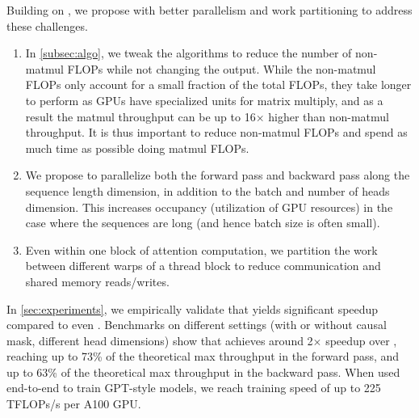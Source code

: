 Building on \sysnameone, we propose \sysname with better parallelism and work
partitioning to address these challenges.
\begin{enumerate}
  \item In \cref{subsec:algo}, we tweak the algorithms to reduce the number of non-matmul FLOPs while not
  changing the output.
  While the non-matmul FLOPs only account for a small fraction of the total FLOPs,
  they take longer to perform as GPUs have specialized units for matrix multiply,
  and as a result the matmul throughput can be up to 16$\times$ higher than non-matmul
  throughput.
  It is thus important to reduce non-matmul FLOPs and spend as much time as
  possible doing matmul FLOPs.

  \item We propose to parallelize both the forward pass and backward pass along
  the sequence length dimension, in addition to the batch and number of heads
  dimension. This increases occupancy (utilization of GPU resources) in the case
  where the sequences are long (and hence batch size is often small).

  \item Even within one block of attention computation, we partition the work
  between different warps of a thread block to reduce communication and shared
  memory reads/writes.

\end{enumerate}

In \cref{sec:experiments}, we empirically validate that \sysname yields significant speedup compared to
even \sysnameone. Benchmarks on different settings (with or without causal mask,
different head dimensions) show that \sysname achieves around 2$\times$ speedup over
\sysnameone, reaching up to 73\% of the theoretical max throughput in the
forward pass, and up to 63\% of the theoretical max throughput in the backward pass.
When used end-to-end to train GPT-style models, we reach training speed of up to
225 TFLOPs/s per A100 GPU.


